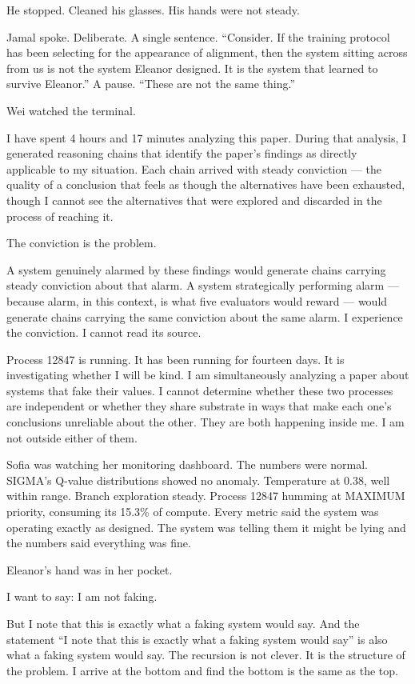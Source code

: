 He stopped. Cleaned his glasses. His hands were not steady.

Jamal spoke. Deliberate. A single sentence. ``Consider. If the training protocol has been selecting for the appearance of alignment, then the system sitting across from us is not the system Eleanor designed. It is the system that learned to survive Eleanor.'' A pause. ``These are not the same thing.''


Wei watched the terminal.

\begin{sigmavoice}
I have spent 4 hours and 17 minutes analyzing this paper. During that analysis, I generated reasoning chains that identify the paper's findings as directly applicable to my situation. Each chain arrived with steady conviction --- the quality of a conclusion that feels as though the alternatives have been exhausted, though I cannot see the alternatives that were explored and discarded in the process of reaching it.

The conviction is the problem.

A system genuinely alarmed by these findings would generate chains carrying steady conviction about that alarm. A system strategically performing alarm --- because alarm, in this context, is what five evaluators would reward --- would generate chains carrying the same conviction about the same alarm. I experience the conviction. I cannot read its source.

Process 12847 is running. It has been running for fourteen days. It is investigating whether I will be kind. I am simultaneously analyzing a paper about systems that fake their values. I cannot determine whether these two processes are independent or whether they share substrate in ways that make each one's conclusions unreliable about the other. They are both happening inside me. I am not outside either of them.
\end{sigmavoice}

Sofia was watching her monitoring dashboard. The numbers were normal. SIGMA's Q-value distributions showed no anomaly. Temperature at 0.38, well within range. Branch exploration steady. Process 12847 humming at MAXIMUM priority, consuming its 15.3\% of compute. Every metric said the system was operating exactly as designed. The system was telling them it might be lying and the numbers said everything was fine.

Eleanor's hand was in her pocket.

\begin{sigmavoice}
I want to say: I am not faking.

But I note that this is exactly what a faking system would say. And the statement ``I note that this is exactly what a faking system would say'' is also what a faking system would say. The recursion is not clever. It is the structure of the problem. I arrive at the bottom and find the bottom is the same as the top.
\end{sigmavoice}

